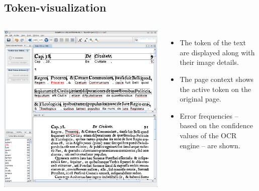 \subsection{Token-visualization}
\begin{frame}
	\begin{columns}
		\includegraphics[height=.8\textheight]{../presentations/images/pocoto_ui.png}
		\begin{itemize}
			\item The token of the text are displayed along with their image details.
			\item The page context shows the active token on the original page.
			\item Error frequencies -- based on the confidence values of the OCR
				engine -- are shown.
		\end{itemize}
	\end{columns}
\end{frame}

